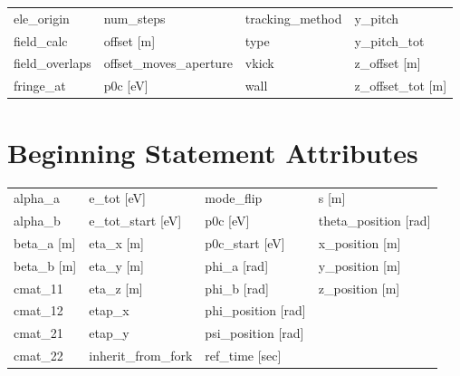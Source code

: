\begin{tabular}{llll}
ele_origin                       & num_steps                        & tracking_method                  & y_pitch                          \\
field_calc                       & offset [m]                       & type                             & y_pitch_tot                      \\
field_overlaps                   & offset_moves_aperture            & vkick                            & z_offset [m]                     \\
fringe_at                        & p0c [eV]                         & wall                             & z_offset_tot [m]                 \\
 \bottomrule
 \end{tabular}
 \vfill
 
 \section{Beginning Statement Attributes}
 \label{s:list.beginning}
 
 \begin{tabular}{llll} \toprule
alpha_a                          & e_tot [eV]                       & mode_flip                        & s [m]                            \\
alpha_b                          & e_tot_start [eV]                 & p0c [eV]                         & theta_position [rad]             \\
beta_a [m]                       & eta_x [m]                        & p0c_start [eV]                   & x_position [m]                   \\
beta_b [m]                       & eta_y [m]                        & phi_a [rad]                      & y_position [m]                   \\
cmat_11                          & eta_z [m]                        & phi_b [rad]                      & z_position [m]                   \\
cmat_12                          & etap_x                           & phi_position [rad]               &                                  \\
cmat_21                          & etap_y                           & psi_position [rad]               &                                  \\
cmat_22                          & inherit_from_fork                & ref_time [sec]                   &                                  \\
 \bottomrule
 \end{tabular}
 \vfill
 
